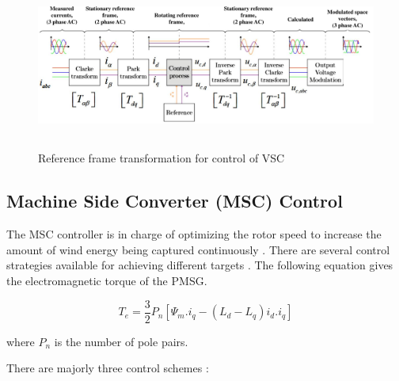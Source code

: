 \begin{figure}[H]
\centering
    \includegraphics[height = 5.5cm,width = 15.5cm]{Diagrams/Chapter_2/DQTransformation.pdf}
    \caption{Reference frame transformation for control of VSC \cite{ndreko2017offshore}}
    \label{fig:DQTransformation}
\end{figure}

\subsection{Machine Side Converter (MSC) Control}
The \gls{MSC} controller is in charge of optimizing the rotor speed to increase the amount of wind energy being captured continuously \cite{strachan_stability_2010}. There are several control strategies available for achieving different targets \cite{bose_power_2006}. The following equation gives the electromagnetic torque of the \gls{PMSG}.

\begin{equation}\label{elec_torque}
T_e = \frac{3}{2}P_n[\Psi_m.i_q-(L_d-L_q)i_d.i_q]    
\end{equation}

where $P_n$ is the number of pole pairs.


There are majorly three control schemes \cite{wu_variable-speed_2011}:

